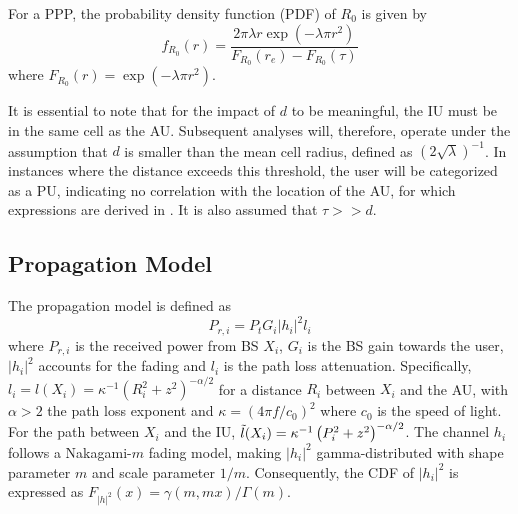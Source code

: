 For a PPP, the probability density function (PDF) of $R_0$ is given by 
\begin{equation}\label{eq:pdf_R0}
    f_{R_0}(r) = \frac{2 \pi \lambda r \exp(-\lambda \pi r^2)}{F_{R_0}(r_e)-F_{R_0}(\tau)}
\end{equation}
where $F_{R_0}(r) = \exp(-\lambda \pi r^2)$.


It is essential to note that for the impact of $d$ to be meaningful, the IU must be in the same cell as the AU. Subsequent analyses will, therefore, operate under the assumption that $d$ is smaller than the mean cell radius, defined as $(2 \sqrt{\lambda})^{-1}$. In instances where the distance exceeds this threshold, the user will be categorized as a PU, indicating no correlation with the location of the AU, for which expressions are derived in \cite{GontierMeta}. It is also assumed that $\tau >> d$.

\subsection{Propagation Model}
\label{ssec:propagation}

The propagation model is defined as
{\smalltonormalsize
\begin{equation}\label{eq:model}
    P_{r, i} = P_t G_i |h_i|^2 l_i 
\end{equation}}
where $P_{r, i}$ is the received power from BS $X_i$, $G_i$ is the BS gain towards the user, $|h_i|^2$ accounts for the fading and $l_i$ is the path loss attenuation. Specifically, $l_i = l(X_i) = \kappa^{-1} \left(R_i^2+z^2\right)^{-\alpha/2}$ for a distance $R_i$ between $X_i$ and the AU, with $\alpha > 2$ the path loss exponent and $\kappa = (4\pi f/c_0)^2$ where $c_0$ is the speed of light. For the path between $X_i$ and the IU, $\Tilde{l}(X_i) = \kappa^{-1} \left(P_i^2+z^2\right)^{-\alpha/2}$. The channel $h_i$ follows a Nakagami-$m$ fading model, making $|h_i|^2$ gamma-distributed with shape parameter $m$ and scale parameter $1/m$. Consequently, the CDF of $|h_i|^2$ is expressed as $F_{|h|^2}(x) = \gamma(m,m x)/\Gamma(m)$.

